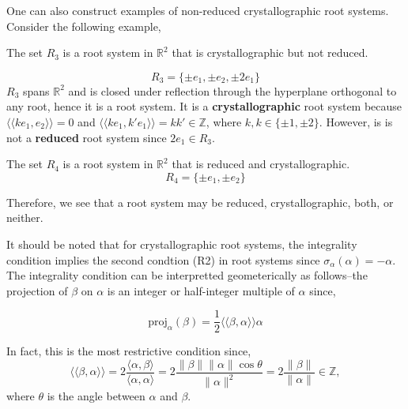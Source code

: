 One can also construct examples of non-reduced crystallographic root systems. Consider the following example,

\begin{example}
    The set $R_3$ is a root system in $\mathbb{R}^2$ that is crystallographic but not reduced.
    
    \begin{equation*}
        R_3 = \{
            \pm e_1, \pm e_2, \pm 2 e_1
        \} 
    \end{equation*}
    $R_3$ spans $\mathbb{R}^2$ and is closed under reflection through the hyperplane orthogonal to any root,
    hence it is a root system.
    It is a \textbf{crystallographic} root system because
    $\langle \langle k e_1, e_2 \rangle \rangle = 0$ and $\langle \langle k e_1, k' e_1 \rangle \rangle = kk' \in \mathbb{Z}$,
    where $k,k \in \{\pm 1, \pm 2\}$.
    However, is is not a \textbf{reduced} root system since $2 e_1 \in R_3$.
\end{example}


\begin{example}
    The set $R_4$ is a root system in $\mathbb{R}^2$ that is reduced and crystallographic.
    \begin{equation*}
        R_4 = \{
            \pm e_1, \pm e_2
            \} 
    \end{equation*}
\end{example}

Therefore, we see that a root system may be reduced, crystallographic, both, or neither. \newline

It should be noted that for crystallographic root systems, the integrality condition implies the second condtion (R2)
in root systems since $\sigma_{\alpha}(\alpha) = -\alpha$.
The integrality condition can be interpretted geometerically as follows--the projection of $\beta$ on $\alpha$ is
an integer or half-integer multiple of $\alpha$ since,

\begin{equation*}
    \text{proj}_{\alpha}(\beta) = \frac{1}{2} \langle \langle \beta, \alpha \rangle \rangle \alpha
\end{equation*}

In fact, this is the most restrictive condition since,
\begin{equation*}
    \langle \langle \beta, \alpha \rangle \rangle 
    =  2 \frac{ \langle \alpha, \beta \rangle}{\langle \alpha, \alpha \rangle}
    = 2 \frac{\|\beta\| \|\alpha\| \cos\theta }{\|\alpha\|^2}
    = 2 \frac{\|\beta\|}{\|\alpha\|} \in \mathbb{Z},
\end{equation*}
where $\theta$ is the angle between $\alpha$ and $\beta$.

